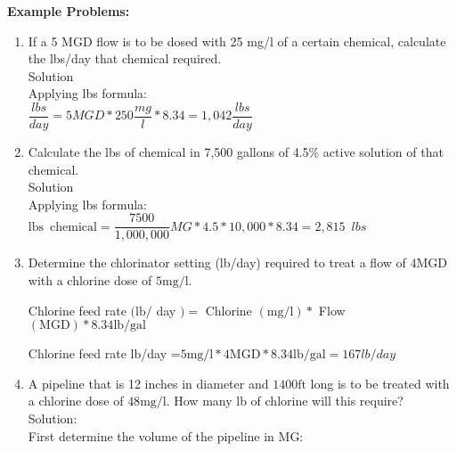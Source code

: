 \textbf{Example Problems:}\\
\begin{enumerate}[1.]
\item If a 5 MGD flow is to be dosed with 25 mg/l of a certain chemical, calculate the lbs/day that chemical required.\\

Solution\\

Applying lbs formula:\\
$\dfrac{lbs}{day}=5 MGD *250\dfrac{mg}{l}*8.34 = \boxed{1,042\dfrac{lbs}{day}}$
\\
\vspace{0.2cm}
\item Calculate the lbs of chemical in 7,500 gallons of 4.5\% active solution of that chemical.\\
Solution\\
Applying lbs formula:\\
$\mathrm{lbs \enspace chemical} = \dfrac{7500}{1,000,000}MG * 4.5*10,000 *8.34 = \boxed{2,815 \enspace lbs}$\\

\vspace{0.2cm}

\item Determine the chlorinator setting (lb/day) required to treat a flow of $4 \mathrm{MGD}$ with a chlorine dose of $5 \mathrm{mg} / \mathrm{l}$.

Chlorine feed rate $(\mathrm{lb} /$ day $)=$ Chlorine $(\mathrm{mg} / \mathrm{l}) *$ Flow $(\mathrm{MGD}) * 8.34 \mathrm{lb} / \mathrm{gal}$

Chlorine feed rate lb/day =$5 \mathrm{mg} / \mathrm{l} * 4 \mathrm{MGD} * 8.34 \mathrm{lb} / \mathrm{gal}=\boxed{167 lb/day}$\\

\item A pipeline that is 12 inches in diameter and $1400 \mathrm{ft}$ long is to be treated with a chlorine dose of $48 \mathrm{mg} / \mathrm{l}$. How many lb of chlorine will this require?\\
\vspace{0.2cm}
Solution:\\
\vspace{0.2cm}
First determine the volume of the pipeline in MG:\\
\vspace{0.2cm}


\end{enumerate}
